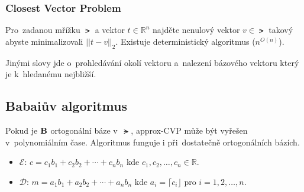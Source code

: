 \subsubsection{Closest Vector Problem}

Pro~zadanou mřížku $\lat$ a vektor $t \in \mathbb{R}^n$ najděte nenulový vektor $v \in \lat$ takový abyste minimalizovali $||t - v||_2$.
Existuje deterministický algoritmus ($n^{O(n)}$).

Jinými slovy jde o~prohledávání okolí vektoru a~nalezení bázového vektoru který je k~hledanému nejbližší.


\subsection{Babaiův algoritmus}

Pokud je $\text{\textbf{B}}$ ortogonální báze v~$\lat$, approx-CVP může být vyřešen v~polynomiálním čase.
Algoritmus funguje i při~dostatečně ortogonálních bázích.

\begin{itemize}
\item $\mathcal{E}$: $c = c_1 b_1 + c_2 b_2 + \cdots + c_n b_n$ kde $c_1, c_2, \dots, c_n \in \mathbb{R}$.
\item $\mathcal{D}$: $m = a_1 b_1 + a_2 b_2 + \cdots + a_n b_n$ kde $a_i = \lceil c_i \rfloor$ pro $i = 1, 2, \dots, n$.
\end{itemize}

